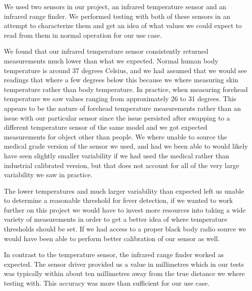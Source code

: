 We used two sensors in our project, an infrared temperature sensor and an
infrared range finder. We performed testing with both of these sensors in an
attempt to characterize them and get an idea of what values we could expect to
read from them in normal operation for our use case.

We found that our infrared temperature sensor consistently returned measurements
much lower than what we expected. Normal human body temperature is around 37
degrees Celsius, and we had assumed that we would see readings that where a few
degrees below this because we where measuring skin temperature rather than
body temperature. In practice, when measuring forehead temperature we saw values
ranging from approximately 26 to 31 degrees. This appears to be the nature of
forehead temperature measurements rather than an issue with our particular sensor
since the issue persisted after swapping to a different temperature sensor of the
same model and we got expected measurements for object other than people. We
where unable to source the medical grade version of the sensor we used, and had
we been able to would likely have seen slightly smaller variability if we had
used the medical rather than industrial calibrated version, but that does not
account for all of the very large variability we saw in practice.


The lower temperatures and much larger variability than expected left us unable
to determine a reasonable threshold for fever detection, if we wanted to work
further on this project we would have to invest more resources into taking a
wide variety of measurements in order to get a better idea of where temperature
thresholds should be set. If we had access to a proper black body radio source
we would have been able to perform better calibration of our sensor as well.

In contrast to the temperature sensor, the infrared range finder worked as
expected. The sensor driver provided us a value in millimetres which in our
tests was typically within about ten millimetres away from the true distance we
where testing with. This accuracy was more than sufficient for our use case.


